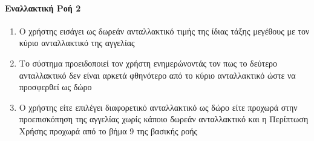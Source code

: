 \documentclass{../ol-softwaremanual}
\begin{document}
	\paragraph{Εναλλακτική Ροή 2}
	
	\begin{enumerate}
		\item Ο χρήστης εισάγει ως δωρεάν ανταλλακτικό τιμής της ίδιας τάξης μεγέθους με τον κύριο ανταλλακτικό της αγγελίας
		\item Το σύστημα προειδοποιεί τον χρήστη ενημερώνοντάς τον πως το δεύτερο ανταλλακτικό δεν είναι αρκετά φθηνότερο από το κύριο ανταλλακτικό ώστε να προσφερθεί ως δώρο
		\item Ο χρήστης είτε επιλέγει διαφορετικό ανταλλακτικό ως δώρο είτε προχωρά στην προεπισκόπηση της αγγελίας χωρίς κάποιο δωρεάν ανταλλακτικό και η Περίπτωση Χρήσης προχωρά από το βήμα 9 της βασικής ροής
	\end{enumerate}
	
%	
\end{document}
